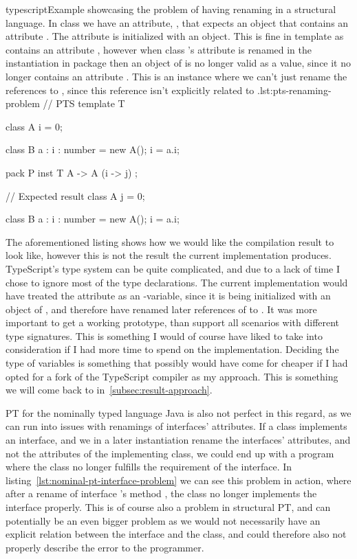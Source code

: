 \begin{code}{typescript}{Example showcasing the problem of having renaming in a structural language. In class  we have an attribute, , that expects an object that contains an attribute . The attribute is initialized with an  object. This is fine in template  as  contains an attribute , however when class 's attribute is renamed in the instantiation in package  then an object of  is no longer valid as a value, since it no longer contains an attribute . This is an instance where we can't just rename the references to , since this reference isn't explicitly related to .}{lst:pts-renaming-problem}
    // PTS
    template T {
        class A {
            i = 0;
        }

        class B {
            a : { i : number } = new A();
            i = a.i;
        }
    }

    pack P {
        inst T { A -> A (i -> j) };
    }

    // Expected result
    class A {
        j = 0;
    }

    class B {
        a : { i : number } = new A();
        i = a.i;
    }
\end{code}

The aforementioned listing shows how we would like the compilation result to look like, however this is not the result the current implementation produces.
TypeScript's type system can be quite complicated, and due to a lack of time I chose to ignore most of the type declarations.
The current implementation would have treated the attribute  as an -variable, since it is being initialized with an object of , and therefore have renamed later references of  to .
It was more important to get a working prototype, than support all scenarios with different type signatures.
This is something I would of course have liked to take into consideration if I had more time to spend on the implementation.
Deciding the type of variables is something that possibly would have come for cheaper if I had opted for a fork of the TypeScript compiler as my approach.
This is something we will come back to in~\vref{subsec:result-approach}.

PT for the nominally typed language Java is also not perfect in this regard, as we can run into issues with renamings of interfaces' attributes.
If a class implements an interface, and we in a later instantiation rename the interfaces' attributes, and not the attributes of the implementing class, we could end up with a program where the class no longer fulfills the requirement of the interface.
In listing~\vref{lst:nominal-pt-interface-problem} we can see this problem in action, where after a rename of interface 's method , the class  no longer implements the interface properly.
This is of course also a problem in structural PT, and can potentially be an even bigger problem as we would not necessarily have an explicit relation between the interface and the class, and could therefore also not properly describe the error to the programmer.

